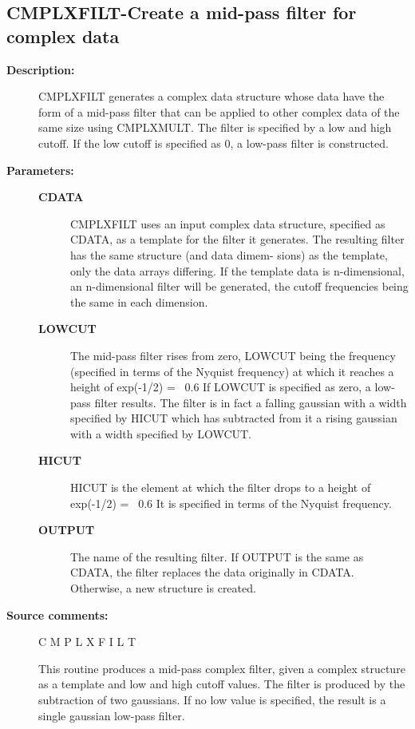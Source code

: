 \subsection{CMPLXFILT-\label{CMPLXFILT}Create a mid-pass filter for complex data}
\begin{description}

\item [\textbf{Description:}]
 CMPLXFILT generates a complex data structure whose data have the
 form of a mid-pass filter that can be applied to other complex
 data of the same size using CMPLXMULT.  The filter is specified
 by a low and high cutoff.  If the low cutoff is specified as 0,
 a low-pass filter is constructed.

\item [\textbf{Parameters:}]
\begin{description}
\item [\textbf{CDATA}]
 CMPLXFILT uses an input complex data structure, specified
 as CDATA, as a template for the filter it generates.  The
 resulting filter has the same structure (and data dimem-
 sions) as the template, only the data arrays differing.
 If the template data is n-dimensional, an n-dimensional
 filter will be generated, the cutoff frequencies being the
 same in each dimension.
\item [\textbf{LOWCUT}]
 The mid-pass filter rises from zero, LOWCUT being the
 frequency (specified in terms of the Nyquist frequency)
 at which it reaches a height of exp(-1/2) = ~0.6  If
 LOWCUT is specified as zero, a low-pass filter results.
 The filter is in fact a falling gaussian with a width
 specified by HICUT which has subtracted from it a rising
 gaussian with a width specified by LOWCUT.
\item [\textbf{HICUT}]
 HICUT is the element at which the filter drops to a
 height of exp(-1/2) = ~0.6   It is specified in terms
 of the Nyquist frequency.
\item [\textbf{OUTPUT}]
 The name of the resulting filter.  If OUTPUT is the
 same as CDATA, the filter replaces the data originally
 in CDATA.  Otherwise, a new structure is created.
\end{description}

\item [\textbf{Source comments:}]
\begin{terminalv}
 C M P L X F I L T

 This routine produces a mid-pass complex filter, given a complex
 structure as a template and low and high cutoff values.  The
 filter is produced by the subtraction of two gaussians.  If no
 low value is specified, the result is a single gaussian low-pass
 filter.


\end{terminalv}
\end{description}
